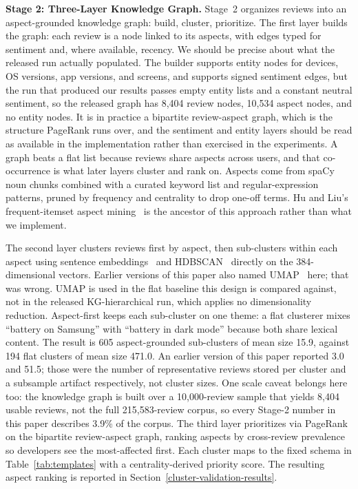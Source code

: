 \documentclass[sigconf, anonymous]{acmart}
\begin{document}
  \textbf{Stage 2: Three-Layer Knowledge Graph.} Stage~2 organizes
  reviews into an aspect-grounded knowledge graph: build, cluster,
  prioritize. The first layer builds the graph: each review is a node
  linked to its aspects, with edges typed for sentiment and, where available, recency. We should
  be precise about what the released run actually populated. The builder supports entity nodes for
  devices, OS versions, app versions, and screens, and supports signed sentiment edges, but the
  run that produced our results passes empty entity lists and a constant neutral sentiment, so the
  released graph has 8{,}404 review nodes, 10{,}534 aspect nodes, and no entity nodes. It is in
  practice a bipartite review-aspect graph, which is the structure PageRank runs over, and the
  sentiment and entity layers should be read as available in the implementation rather than
  exercised in the experiments. A
  graph beats a flat list because reviews share aspects across users,
  and that co-occurrence is what later layers cluster and rank on.
  Aspects come from spaCy noun chunks combined with a curated keyword list and
  regular-expression patterns, pruned by frequency and centrality to drop one-off terms. Hu and
  Liu's frequent-itemset aspect mining~\cite{hu2004mining} is the ancestor of this approach
  rather than what we implement.

  The second layer clusters reviews first by aspect, then sub-clusters
  within each aspect using sentence embeddings~\cite{reimers2019sentence} and
  HDBSCAN~\cite{mcinnes2017hdbscan} directly on the 384-dimensional vectors. Earlier versions of
  this paper also named UMAP~\cite{mcinnes2018umap} here; that was wrong. UMAP is used in the flat
  baseline this design is compared against, not in the released KG-hierarchical run, which applies
  no dimensionality reduction. Aspect-first keeps each
  sub-cluster on one theme: a flat clusterer mixes ``battery on Samsung''
  with ``battery in dark mode'' because both share lexical content. The result is 605 aspect-grounded sub-clusters of mean size 15.9, against 194 flat clusters of
  mean size 471.0. An earlier version of this paper reported 3.0 and 51.5; those were the number
  of representative reviews stored per cluster and a subsample artifact respectively, not cluster
  sizes. One scale caveat belongs here too: the knowledge graph is built over a 10{,}000-review
  sample that yields 8{,}404 usable reviews, not the full 215{,}583-review corpus, so every
  Stage-2 number in this paper describes 3.9\% of the corpus. The third layer prioritizes via
  PageRank~\cite{brin1998anatomy, page1999pagerank} on the bipartite
  review-aspect graph, ranking aspects by cross-review prevalence so
  developers see the most-affected first. Each
  cluster maps to the fixed schema in Table~\ref{tab:templates} with a
  centrality-derived priority score. The resulting aspect ranking is reported in
  Section~\ref{cluster-validation-results}.
\end{document}
